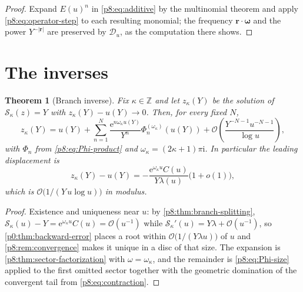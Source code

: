 \documentclass[11pt,a4paper,oneside]{book}
\theoremstyle{plain}
\newtheorem{theorem}{Theorem}[chapter]
\theoremstyle{definition}
\theoremstyle{remark}
\newcommand{\Int}{\mathbb{Z}}
\newcommand{\e}{\mathrm{e}}
\newcommand{\ii}{\mathrm{i}}
\newcommand{\bigO}{\mathcal{O}}
\newcommand{\littleo}{o}
\begin{document}
\begin{proof}
Expand $E(u)^{n}$ in \eqref{p8:eq:additive} by the multinomial theorem and
apply \eqref{p8:eq:operator-step} to each resulting monomial; the frequency
$\bm r\cdot\bm\omega$ and the power $Y^{-|\bm r|}$ are preserved by
$\mathscr{D}_u$, as the computation there shows.
\end{proof}

\section{The inverses}
\label{p8:sec:inverses}

\begin{theorem}[Branch inverse]\label{p8:thm:branch-inverse}
Fix $\kappa\in\Int$ and let $z_\kappa(Y)$ be the solution of
$\mathcal{S}_\kappa(z)=Y$ with $z_\kappa(Y)-u(Y)\to0$.  Then, for every fixed
$N$,
\begin{equation}\label{p8:eq:branch-inverse}
 z_\kappa(Y)=u(Y)+\sum_{n=1}^{N}
 \frac{\e^{n\omega_\kappa u(Y)}}{Y^{n}}\Phi_n^{(\omega_\kappa)}(u(Y))
 +\bigO\!\left(\frac{Y^{-N-1}u^{-N-1}}{\log u}\right),
\end{equation}
with $\Phi_n$ from \eqref{p8:eq:Phi-product} and $\omega_\kappa=(2\kappa+1)
\pi\ii$.  In particular the leading displacement is
\begin{equation}\label{p8:eq:branch-leading}
 z_\kappa(Y)-u(Y)=-\frac{\e^{\omega_\kappa u}C(u)}{Y\lambda(u)}
 \bigl(1+\littleo(1)\bigr),
\end{equation}
which is $\bigO\bigl(1/(Y\,u\log u)\bigr)$ in modulus.
\end{theorem}

\begin{proof}
Existence and uniqueness near $u$: by \cref{p8:thm:branch-splitting},
$\mathcal{S}_\kappa(u)-Y=\e^{\omega_\kappa u}C(u)=\bigO(u^{-1})$ while
$\mathcal{S}_\kappa'(u)=Y\lambda+\bigO(u^{-1})$, so
\cref{p0:thm:backward-error} places a root within
$\bigO\bigl(1/(Y\lambda u)\bigr)$ of $u$ and \cref{p8:rem:convergence} makes
it unique in a disc of that size.  The expansion is
\cref{p8:thm:sector-factorization} with $\omega=\omega_\kappa$, and the
remainder is \eqref{p8:eq:Phi-size} applied to the first omitted sector
together with the geometric domination of the convergent tail from
\eqref{p8:eq:contraction}.
\end{proof}
\end{document}
